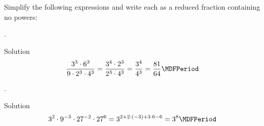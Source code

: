 \begin{MExercises}
\begin{MExercise}
Simplify the following expressions and write each as a reduced fraction containing no powers:
\begin{MExerciseItems}
\item{.\\\begin{MHint}{Solution} $$\Mdfrac{3^3\cdot 6^3}{9\cdot2^3\cdot 4^3}=\Mdfrac{3^4\cdot 2^3}{2^3\cdot 4^3}=\Mdfrac{3^4}{4^3}=\Mdfrac{81}{64} \MDFPeriod$$\end{MHint}}
\item{.\\\begin{MHint}{Solution} $$3^2\cdot 9^{-3}\cdot 27^{-2}\cdot 27^{6}=3^{2+2\cdot(-3)+3\cdot 6-6}=3^{8} \MDFPeriod$$\end{MHint}}
\end{MExerciseItems}
\end{MExercise}

% 


\end{MExercises}


